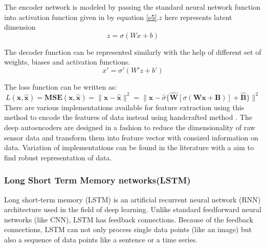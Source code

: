 The encoder network is modeled by passing the standard neural network function into activation function given in by equation \ref{e5}.$z$ here represents latent dimension
\begin{equation}
z=\sigma (Wx+b)
\label{e5}
\end{equation}

The decoder function can be represented similarly with the help of different set of weights, biases and activation functions.
\begin{equation}
x'= \sigma'(W'z+b')
\label{e6}
\end{equation}

The loss function can be written as:
\begin{equation} 
L(\mathbf{x}, \hat{\mathbf{x}}) = \mathbf{MSE}(\mathbf{x}, \hat{\mathbf{x}}) = \|  \mathbf{x} - \hat{\mathbf{x}} \| ^2 =  \| \mathbf{x} - \hat{\sigma} \{ \hat{\mathbf{W}} \left[\sigma ( \mathbf{W}\mathbf{x} + \mathbf{B} )\right]  + \hat{\mathbf{B}} \} \| ^2 \end{equation}
There are various implementations available for feature extraction using this method to encode the features of data instead using handcrafted method \cite{gerazov2018variational}. The deep autoencoders are designed in a fashion to reduce the dimensionality of raw sensor data \cite{ravi2019current} and transform them into feature vector with consized information on data. Variation of implementations can be found in the literature with a aim to find robust representation of data.

    \subsubsection{Long Short Term Memory networks(LSTM)}
    Long short-term memory (LSTM) is an artificial recurrent neural network (RNN) architecture used in the field of deep learning. Unlike standard feedforward neural networks (like CNN), LSTM has feedback connections. Because of the feedback connections, LSTM can not only process single data points (like an image) but also a sequence of data points like a sentence or a time series. 
    
